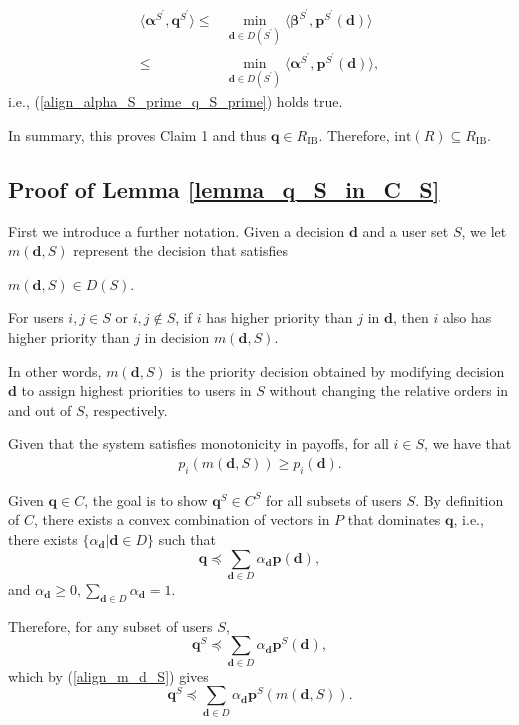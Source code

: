 \documentclass[prodmode,acmtompecs]{acmsmall}
\newcommand{\reqvec}{\mathbf{q}}
\begin{document}
\begin{align*}
\langle \boldsymbol{\alpha}^{S^\prime}, \mathbf{q}^{S^\prime} \rangle \leq & \min\limits_{\mathbf{d} \in D(S^\prime)} \langle \boldsymbol{\beta}^{S^\prime},  \mathbf{p}^{S^\prime}(\mathbf{d}) \rangle	\\
\leq & \min\limits_{\mathbf{d} \in D(S^\prime)} \langle \boldsymbol{\alpha}^{S^\prime},  \mathbf{p}^{S^\prime}(\mathbf{d}) \rangle, 
\end{align*}
i.e., (\ref{align_alpha_S_prime_q_S_prime}) holds true. 

In summary, this proves Claim 1 and thus $\reqvec \in R_\text{IB}$. Therefore, $\text{int}(R) \subseteq R_\text{IB}$. 

\subsection{Proof of Lemma \ref{lemma_q_S_in_C_S}}
\label{pf_lemma_q_S_in_C_S}
First we introduce a further notation. Given a decision $\mathbf{d}$ and a user set $S$, we let $m(\mathbf{d}, S)$ represent the decision that satisfies
\begin{longitem}
\item $m(\mathbf{d}, S) \in D(S)$. 
\item For users $i, j \in S$ or $i, j \notin S$, if $i$ has higher priority than $j$ in $\mathbf{d}$, then $i$ also has higher priority than $j$ in decision $m(\mathbf{d}, S)$. 
\end{longitem}
In other words, $m(\mathbf{d}, S)$ is the priority decision obtained by modifying decision $\mathbf{d}$ to assign highest priorities to users in $S$ without changing the relative orders in and out of $S$, respectively. 

Given that the system satisfies monotonicity in payoffs, for all $i \in S$, we have that
\begin{align}
\label{align_m_d_S}
p_i(m(\mathbf{d}, S)) \geq p_i(\mathbf{d}). 
\end{align}

Given $\reqvec \in C$, the goal is to show $\reqvec^S \in C^S$ for all subsets of users $S$. 
By definition of $C$, there exists a convex combination of vectors in $P$ that dominates $\reqvec$, i.e., there exists $\{\alpha_\mathbf{d} | \mathbf{d} \in D\}$ such that 
$$
\reqvec \preceq \sum\limits_{\mathbf{d} \in D} \alpha_\mathbf{d} \mathbf{p}(\mathbf{d}), 
$$
and $\alpha_\mathbf{d} \geq 0, \sum\limits_{\mathbf{d} \in D} \alpha_\mathbf{d} = 1$. 

Therefore, for any subset of users $S$, 
$$
\reqvec^S \preceq \sum\limits_{\mathbf{d} \in D} \alpha_\mathbf{d} \mathbf{p}^S(\mathbf{d}), 
$$
which by (\ref{align_m_d_S}) gives
$$
\reqvec^S \preceq \sum\limits_{\mathbf{d} \in D} \alpha_\mathbf{d} \mathbf{p}^S(m(\mathbf{d}, S)). 
$$
\end{document}

